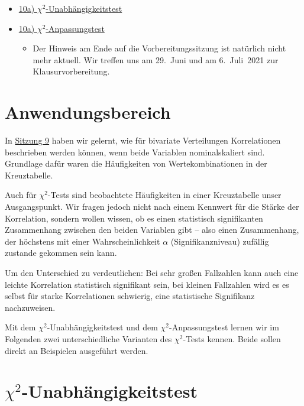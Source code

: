 \documentclass[
  11pt,
  ngerman,
  a4paper,
]{report}
\providecommand{\tightlist}{%
  \setlength{\itemsep}{0pt}\setlength{\parskip}{0pt}}
\begin{document}
\begin{itemize}
\tightlist
\item
  \href{https://video01.uni-frankfurt.de/Mediasite/Play/201d31a1bd8448a8a22dd61396f3126c1d}{10a) \(\chi^2\)-Unabhängigkeitstest}
\item
  \href{https://video01.uni-frankfurt.de/Mediasite/Play/587c77b97ba84bb696efec95b25591d61d}{10a) \(\chi^2\)-Anpassungstest}

  \begin{itemize}
  \tightlist
  \item
    Der Hinweis am Ende auf die Vorbereitungssitzung ist natürlich nicht mehr aktuell. Wir treffen uns am 29.~Juni und am 6.~Juli~2021 zur Klausurvorbereitung.
  \end{itemize}
\end{itemize}

\hypertarget{anwendungsbereich}{%
\section*{Anwendungsbereich}\label{anwendungsbereich}}

In \protect\hyperlink{bivariate-verteilungen-mit-nominalen-variablen}{Sitzung 9} haben wir gelernt, wie für bivariate Verteilungen Korrelationen beschrieben werden können, wenn beide Variablen nominalskaliert sind. Grundlage dafür waren die Häufigkeiten von Wertekombinationen in der Kreuztabelle.

Auch für \(\chi^2\)-Tests sind beobachtete Häufigkeiten in einer Kreuztabelle unser Ausgangspunkt. Wir fragen jedoch nicht nach einem Kennwert für die Stärke der Korrelation, sondern wollen wissen, ob es einen statistisch signifikanten Zusammenhang zwischen den beiden Variablen gibt -- also einen Zusammenhang, der höchstens mit einer Wahrscheinlichkeit \(\alpha\) (Signifikanzniveau) zufällig zustande gekommen sein kann.

Um den Unterschied zu verdeutlichen: Bei sehr großen Fallzahlen kann auch eine leichte Korrelation statistisch signifikant sein, bei kleinen Fallzahlen wird es es selbst für starke Korrelationen schwierig, eine statistische Signifikanz nachzuweisen.

Mit dem \(\chi^2\)-Unabhängigkeitstest und dem \(\chi^2\)-Anpassungstest lernen wir im Folgenden zwei unterschiedliche Varianten des \(\chi^2\)-Tests kennen. Beide sollen direkt an Beispielen ausgeführt werden.

\hypertarget{chi2-unabhuxe4ngigkeitstest}{%
\section{\texorpdfstring{\(\chi^2\)-Unabhängigkeitstest}{\textbackslash chi\^{}2-Unabhängigkeitstest}}\label{chi2-unabhuxe4ngigkeitstest}}
\end{document}
